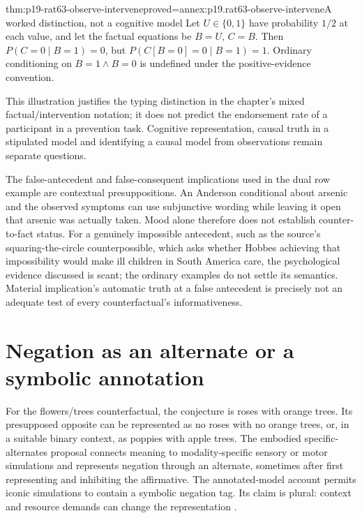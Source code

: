 \begin{hblemma}{thm:p19-rat63-observe-intervene}{proved=annex:p19.rat63-observe-intervene}{A worked distinction, not a cognitive model}
Let \(U\in\{0,1\}\) have probability \(1/2\) at each value,
and let the factual equations be \(B=U\), \(C=B\).
Then \(P(C=0\mid B=1)=0\), but
\(P(C[B=0]=0\mid B=1)=1\). Ordinary conditioning on
\(B=1\land B=0\) is undefined under the positive-evidence convention.
\end{hblemma}

This illustration justifies the typing distinction in the chapter's
mixed factual/intervention notation; it does not predict the endorsement
rate of a participant in a prevention task. Cognitive representation,
causal truth in a stipulated model and identifying a causal model from
observations remain separate questions.

The false-antecedent and false-consequent implications used in the dual
row example are contextual presuppositions. An Anderson conditional about
arsenic and the observed symptoms can use subjunctive wording while
leaving it open that arsenic was actually taken. Mood alone therefore
does not establish counter-to-fact status. For a genuinely impossible
antecedent, such as the source's squaring-the-circle counterpossible,
which asks whether Hobbes achieving that impossibility would make ill
children in South America care, the psychological evidence discussed
is scant; the ordinary examples do not settle its semantics.
Material implication's automatic truth
at a false antecedent is precisely not an adequate test of every
counterfactual's informativeness.

\section{Negation as an alternate or a symbolic annotation}
\label{sec:p19-rat63-negation}

For the flowers/trees counterfactual, the conjecture is roses with
orange trees. Its presupposed opposite can be represented as no roses
with no orange trees, or, in a suitable binary context, as poppies with
apple trees. The embodied specific-alternates proposal connects meaning
to modality-specific sensory or motor simulations and represents negation
through an alternate, sometimes after first representing and inhibiting
the affirmative. The annotated-model account permits iconic simulations
to contain a symbolic negation tag. Its claim is plural: context and
resource demands can change the representation
\cite[Sec.~3.2, pp.~413--415]{ByrneEspino2021ConditionalCounterfactual}.

